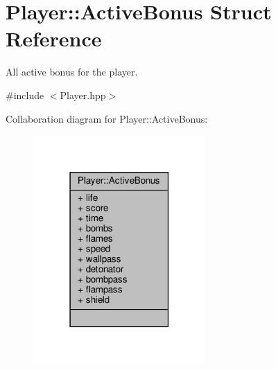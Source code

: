 \hypertarget{struct_player_1_1_active_bonus}{}\section{Player\+:\+:Active\+Bonus Struct Reference}
\label{struct_player_1_1_active_bonus}


All active bonus for the player.  




{\ttfamily \#include $<$Player.\+hpp$>$}



Collaboration diagram for Player\+:\+:Active\+Bonus\+:
\nopagebreak
\begin{figure}[H]
\begin{center}
\leavevmode
\includegraphics[width=186pt]{struct_player_1_1_active_bonus__coll__graph}
\end{center}
\end{figure}
